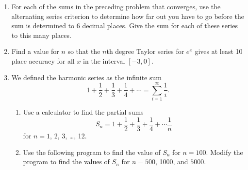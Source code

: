 \begin{enumerate}
\begin{enumerate}
  \item ${\displaystyle \sum_{n=2}^{\infty} (-1)^n\dfrac{n}{\ln{n}}}$

  \item ${\displaystyle \sum_{n=1}^{\infty} (-1)^n\dfrac{n}{5n-4}}$

  \item ${\displaystyle \sum_{n=1}^{\infty} (-1)^n\dfrac{\arctan{n}}{n}}$

  \item ${\displaystyle \sum_{n=1}^{\infty} (-1)^n\dfrac{(1.0001)^n}{n^{10}+1}}$

  \item ${\displaystyle \sum_{n=1}^{\infty} (-1)^n\dfrac{1}{n^{1/n}}}$

  \item ${\displaystyle \sum_{n=2}^{\infty} (-1)^n\dfrac{1}{\ln{n}}}$

  \item ${\displaystyle \sum_{n=1}^{\infty} (-1)^n\dfrac{n!}{n^n}}$

  \item ${\displaystyle \sum_{n=1}^{\infty} (-1)^n\dfrac{n!}{1\cdot 3\cdot 5\cdots (2n-1)}}$


\end{enumerate}
\item For each of the sums in the preceding problem that converges, use
the alternating series criterion to determine how far out you have to
go before the sum is determined to 6 decimal places.  Give the sum for
each of these series to this many places.


\item Find a value for $n$ so that the $n$th degree Taylor series for
$e^x$ gives at least 10 place accuracy for all $x$ in the interval
$[-3, 0]$.


\item We defined the harmonic series as the infinite sum
\[
1 + \dfrac{1}{2} + \dfrac{1}{3} + \dfrac{1}{4} + \cdots 
   = \sum_{i=1}^\infty \dfrac{1}{i} .
\]


  \begin{enumerate}
  \item Use a calculator to find the partial sums
\[
S_n = 1 + \dfrac{1}{2} + \dfrac{1}{3} + \dfrac{1}{4} + \cdots \dfrac{1}{n}
\]
for  $n = 1$, 2, 3, \ldots , 12.

  \item Use the following program to find the value of $S_n$ for $n =
100$.  Modify the program to find the values of $S_n$ for $n = 500$,
1000, and $5000$.




\end{enumerate}
\end{enumerate}
